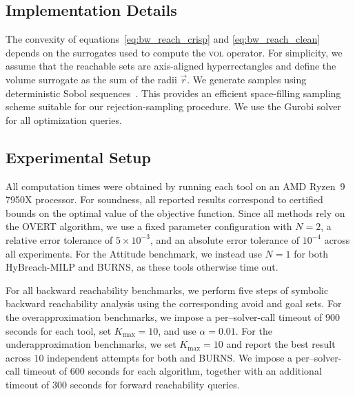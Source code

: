\documentclass[letterpaper, 10 pt, conference]{ieeeconf}  %
\begin{document}
\subsection{Implementation Details}
The convexity of equations~\eqref{eq:bw_reach_crisp} and \eqref{eq:bw_reach_clean} depends on the surrogates used to compute the \textsc{vol} operator. For simplicity, we assume that the reachable sets are axis-aligned hyperrectangles and define the volume surrogate as the sum of the radii $\vec{r}$.
We generate samples using deterministic Sobol sequences~\cite{sobol1967distribution}. This provides an efficient space-filling sampling scheme suitable for our rejection-sampling procedure. We use the Gurobi solver \cite{gurobi} for all optimization queries.

\subsection{Experimental Setup}
All computation times were obtained by running each tool on an AMD Ryzen~9 7950X processor. For soundness, all reported results correspond to certified bounds on the optimal value of the objective function. Since all methods rely on the \textsc{OVERT} algorithm, we use a fixed parameter configuration with $N = 2$, a relative error tolerance of $5 \times 10^{-3}$, and an absolute error tolerance of $10^{-4}$ across all experiments. For the Attitude benchmark, we instead use $N = 1$ for both HyBreach-MILP and BURNS, as these tools otherwise time out.

For all backward reachability benchmarks, we perform five steps of symbolic backward reachability analysis using the corresponding avoid and goal sets. For the overapproximation benchmarks, we impose a per–solver-call timeout of $900$ seconds for each tool, set $K_{\text{max}} = 10$, and use $\alpha = 0.01$. 
For the underapproximation benchmarks, we set $K_{\text{max}} = 10$ and report the best result across $10$ independent attempts for both \ssharp and BURNS. We impose a per–solver-call timeout of $600$ seconds for each algorithm, together with an additional timeout of $300$ seconds for forward reachability queries.
\end{document}
